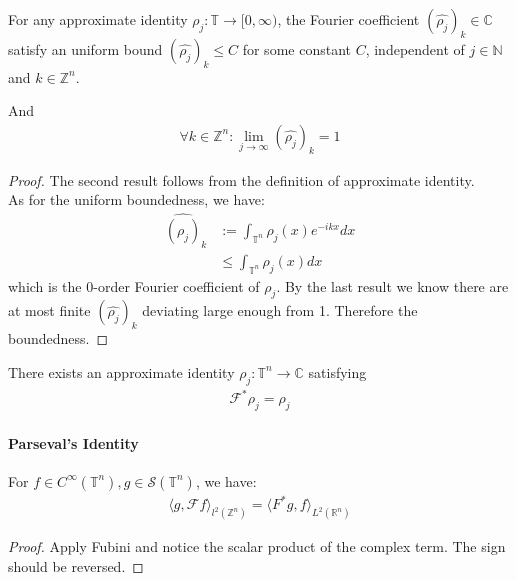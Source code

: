 \begin{lemma}
	For any approximate identity $\rho_j: \mathbb{T} \rightarrow [0, \infty)$, the Fourier coefficient $(\widehat{\rho_j})_k \in \mathbb{C}$ satisfy an uniform bound $(\hat{\rho_j})_k \leq C$ for some constant $C$, independent of $j \in \mathbb{N}$ and $k \in \mathbb{Z}^n$. \par
	And
	\begin{align*}
		\forall k \in \mathbb{Z}^n: \lim_{j \rightarrow \infty} (\widehat{\rho_j})_k = 1
	\end{align*} 
\end{lemma}
\begin{proof}
	The second result follows from the definition of approximate identity.\\
	As for the uniform boundedness, we have:
	\begin{align*}
		\widehat{(\rho_j)}_k &:= \int_{\mathbb{T}^n} \rho_j(x) e^{-ikx}dx\\
		&\leq \int_{\mathbb{T}^n} \rho_j(x) dx
	\end{align*}
	which is the 0-order Fourier coefficient of $\rho_j$. By the last result we know there are at most finite $(\widehat{\rho_j})_k$ deviating large enough from 1. Therefore the boundedness.
\end{proof}

\begin{lemma}
	There exists an approximate identity $\rho_j: \mathbb{T}^n \rightarrow     \mathbb{C}$ satisfying
	\begin{align*}
		\mathcal{F}^*  \rho_j = \rho_j
	\end{align*}
\end{lemma}

\paragraph{Parseval's Identity}
\begin{lemma}
	For $f \in C^\infty(\mathbb{T}^n), g \in \mathcal{S}(\mathbb{T}^n)$, we have:
	\begin{align*}
		\langle g, \mathcal{F} f \rangle_{l^2(\mathbb{Z}^n)} = \langle F^* g, f \rangle_{L^2(\mathbb{R}^n)}
	\end{align*}
\end{lemma}
\begin{proof}
	Apply Fubini and notice the scalar product of the complex term. The sign should be reversed.
\end{proof}

